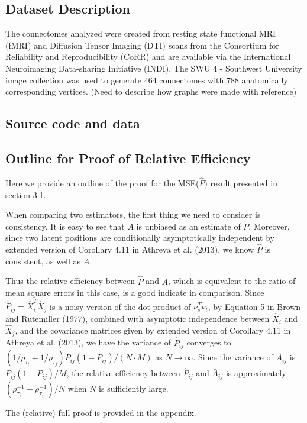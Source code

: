 	\subsection{Dataset Description}
	The connectomes analyzed were created from resting state functional MRI (fMRI) and Diffusion Tensor Imaging (DTI) scans from the Consortium for Reliability and Reproducibility (CoRR) and are available via the International Neuroimaging Data-sharing Initiative (INDI).  The SWU 4 - Southwest University image collection was used to generate 464 connectomes with 788 anatomically corresponding vertices.  (Need to describe how graphs were made with reference)
	\subsection{Source code and data}
	\subsection{Outline for Proof of Relative Efficiency}
	Here we provide an outline of the proof for the MSE($\hat{P}$) result presented in section 3.1.
	
	When comparing two estimators, the first thing we need to consider is consistency.
	It is easy to see that $\bar{A}$ is unbiased as an estimate of $P$. Moreover, since two latent positions are conditionally asymptotically independent by extended version of Corollary 4.11 in Athreya et al. (2013), we know $\hat{P}$ is consistent, as well as $\bar{A}$.
	
	Thus the relative efficiency between $\hat{P}$ and $\bar{A}$, which is equivalent to the ratio of mean square errors in this case, is a good indicate in comparison.
	Since $\hat{P}_{ij} = \hat{X}_i^T \hat{X}_j$ is a noisy version of the dot product of $\nu_s^T \nu_t$, by Equation 5 in Brown and Rutemiller (1977), combined with asymptotic independence between $\hat{X}_i$ and $\hat{X}_j$, and the covariance matrices given by extended version of Corollary 4.11 in Athreya et al. (2013), we have the variance of $\hat{P}_{ij}$ converges to $\left( 1/\rho_{\tau_i} + 1/\rho_{\tau_j} \right) P_{ij} (1-P_{ij})/(N \cdot M)$ as $N \rightarrow \infty$. Since the variance of $\bar{A}_{ij}$ is $P_{ij} (1-P_{ij})/M$, the relative efficiency between $\hat{P}_{ij}$ and $\bar{A}_{ij}$ is approximately $(\rho_{\tau_i}^{-1} + \rho_{\tau_j}^{-1})/N$ when $N$ is sufficiently large.
	
	The (relative) full proof is provided in the appendix. 
